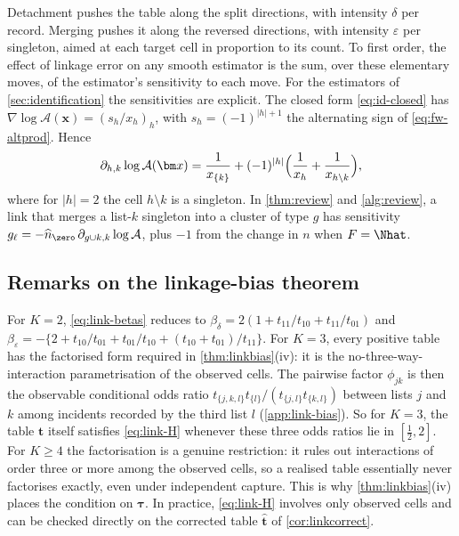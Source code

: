 Detachment pushes the table along the split directions, with intensity $\delta$ per record. Merging pushes it along the reversed directions, with intensity $\varepsilon$ per singleton, aimed at each target cell in proportion to its count. To first order, the effect of linkage error on any smooth estimator is the sum, over these elementary moves, of the estimator's sensitivity to each move. For the estimators of \cref{sec:identification} the sensitivities are explicit. The closed form \eqref{eq:id-closed} has $\nabla\log\mathcal A(\bm x)=(s_h/x_h)_h$, with $s_h=(-1)^{|h|+1}$ the alternating sign of \eqref{eq:fw-altprod}. Hence
\begin{equation}\label{eq:link-splitsens}
  \partial_{h,k}\log\mathcal A(\bm x)=\frac{1}{x_{\{k\}}}+(-1)^{|h|}\Bigl(\frac1{x_h}+\frac1{x_{h\setminus k}}\Bigr),
\end{equation}
where for $|h|=2$ the cell $h\setminus k$ is a singleton. In \cref{thm:review} and \cref{alg:review}, a link that merges a list-$k$ singleton into a cluster of type $g$ has sensitivity $g_\ell=-\widehat n_{\zero}\,\partial_{g\cup k,k}\log\mathcal A$, plus $-1$ from the change in $n$ when $F=\Nhat$.

\subsection{Remarks on the linkage-bias theorem}\label{app:link-biasremarks}

\begin{remark}\label{rem:link-H}
For $K=2$, \eqref{eq:link-betas} reduces to $\beta_\delta=2(1+t_{11}/t_{10}+t_{11}/t_{01})$ and $\beta_\varepsilon=-\{2+t_{10}/t_{01}+t_{01}/t_{10}+(t_{10}+t_{01})/t_{11}\}$. For $K=3$, every positive table has the factorised form required in \cref{thm:linkbias}(iv): it is the no-three-way-interaction parametrisation of the observed cells. The pairwise factor $\phi_{jk}$ is then the observable conditional odds ratio $t_{\{j,k,l\}}t_{\{l\}}/(t_{\{j,l\}}t_{\{k,l\}})$ between lists $j$ and $k$ among incidents recorded by the third list $l$ (\cref{app:link-bias}). So for $K=3$, the table $\bm t$ itself satisfies \eqref{eq:link-H} whenever these three odds ratios lie in $[\frac12,2]$. For $K\ge4$ the factorisation is a genuine restriction: it rules out interactions of order three or more among the observed cells, so a realised table essentially never factorises exactly, even under independent capture. This is why \cref{thm:linkbias}(iv) places the condition on $\bm\tau$. In practice, \eqref{eq:link-H} involves only observed cells and can be checked directly on the corrected table $\hat{\bm t}$ of \cref{cor:linkcorrect}.
\end{remark}

